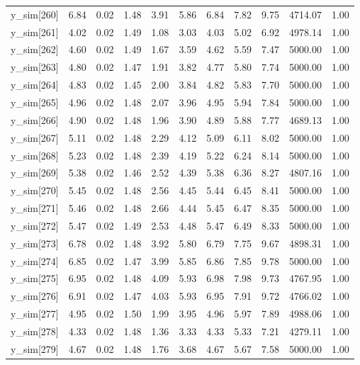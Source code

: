 \begin{table}[ht]
\begin{tabular}{rrrrrrrrrrr}
  y\_sim[260] & 6.84 & 0.02 & 1.48 & 3.91 & 5.86 & 6.84 & 7.82 & 9.75 & 4714.07 & 1.00 \\ 
  y\_sim[261] & 4.02 & 0.02 & 1.49 & 1.08 & 3.03 & 4.03 & 5.02 & 6.92 & 4978.14 & 1.00 \\ 
  y\_sim[262] & 4.60 & 0.02 & 1.49 & 1.67 & 3.59 & 4.62 & 5.59 & 7.47 & 5000.00 & 1.00 \\ 
  y\_sim[263] & 4.80 & 0.02 & 1.47 & 1.91 & 3.82 & 4.77 & 5.80 & 7.74 & 5000.00 & 1.00 \\ 
  y\_sim[264] & 4.83 & 0.02 & 1.45 & 2.00 & 3.84 & 4.82 & 5.83 & 7.70 & 5000.00 & 1.00 \\ 
  y\_sim[265] & 4.96 & 0.02 & 1.48 & 2.07 & 3.96 & 4.95 & 5.94 & 7.84 & 5000.00 & 1.00 \\ 
  y\_sim[266] & 4.90 & 0.02 & 1.48 & 1.96 & 3.90 & 4.89 & 5.88 & 7.77 & 4689.13 & 1.00 \\ 
  y\_sim[267] & 5.11 & 0.02 & 1.48 & 2.29 & 4.12 & 5.09 & 6.11 & 8.02 & 5000.00 & 1.00 \\ 
  y\_sim[268] & 5.23 & 0.02 & 1.48 & 2.39 & 4.19 & 5.22 & 6.24 & 8.14 & 5000.00 & 1.00 \\ 
  y\_sim[269] & 5.38 & 0.02 & 1.46 & 2.52 & 4.39 & 5.38 & 6.36 & 8.27 & 4807.16 & 1.00 \\ 
  y\_sim[270] & 5.45 & 0.02 & 1.48 & 2.56 & 4.45 & 5.44 & 6.45 & 8.41 & 5000.00 & 1.00 \\ 
  y\_sim[271] & 5.46 & 0.02 & 1.48 & 2.66 & 4.44 & 5.45 & 6.47 & 8.35 & 5000.00 & 1.00 \\ 
  y\_sim[272] & 5.47 & 0.02 & 1.49 & 2.53 & 4.48 & 5.47 & 6.49 & 8.33 & 5000.00 & 1.00 \\ 
  y\_sim[273] & 6.78 & 0.02 & 1.48 & 3.92 & 5.80 & 6.79 & 7.75 & 9.67 & 4898.31 & 1.00 \\ 
  y\_sim[274] & 6.85 & 0.02 & 1.47 & 3.99 & 5.85 & 6.86 & 7.85 & 9.78 & 5000.00 & 1.00 \\ 
  y\_sim[275] & 6.95 & 0.02 & 1.48 & 4.09 & 5.93 & 6.98 & 7.98 & 9.73 & 4767.95 & 1.00 \\ 
  y\_sim[276] & 6.91 & 0.02 & 1.47 & 4.03 & 5.93 & 6.95 & 7.91 & 9.72 & 4766.02 & 1.00 \\ 
  y\_sim[277] & 4.95 & 0.02 & 1.50 & 1.99 & 3.95 & 4.96 & 5.97 & 7.89 & 4988.06 & 1.00 \\ 
  y\_sim[278] & 4.33 & 0.02 & 1.48 & 1.36 & 3.33 & 4.33 & 5.33 & 7.21 & 4279.11 & 1.00 \\ 
  y\_sim[279] & 4.67 & 0.02 & 1.48 & 1.76 & 3.68 & 4.67 & 5.67 & 7.58 & 5000.00 & 1.00 \\ 

\end{tabular}
\end{table}
